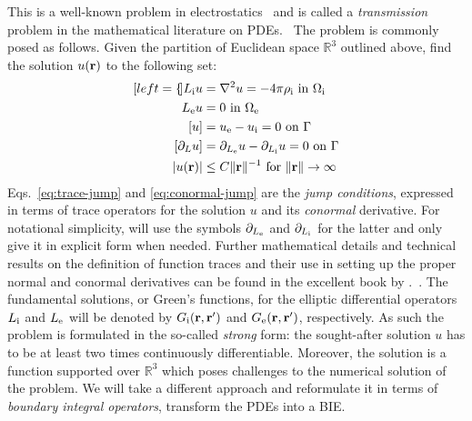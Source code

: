This is a well-known problem in electrostatics~\autocite{Jackson1999, Vanderlinde2005-gf}
and is called a \emph{transmission} problem in the mathematical
literature on \acp{PDE}.~\autocite{Hackbusch1995-uq, Sauter2011-an}
The problem is commonly posed as follows. Given the partition of Euclidean
space $\mathbb{R}^3$ outlined above, find the solution $u(\mathbf{r})$
to the following set:
\begin{subequations}\label{eq:transmission}
  \begin{align}[left={\empheqlbrace}]
  \Li u &= \nabla^2 u = -4\pi\rhoi \,\, \text{in}\,\, \Omegai \label{eq:internal} \\
  \Le u &= 0 \,\, \text{in}\,\, \Omegae \label{eq:external} \\
  [u] &= \ue - \ui = 0 \,\, \text{on}\,\, \Gamma
  \label{eq:trace-jump} \\
[\partial_L u] &= \partiale u - \partiali u = 0 \,\, \text{on}\,\, \Gamma \label{eq:conormal-jump} \\
|u(\vect{r})| &\leq C \|\vect{r} \|^{-1} \,\,\text{for}\,\,\| \vect{r} \|\rightarrow\infty
\label{eq:radiation}
\end{align}
\end{subequations}
Eqs.~\eqref{eq:trace-jump} and \eqref{eq:conormal-jump}
are the \emph{jump conditions}, expressed in terms of trace operators
for the solution $u$ and its \emph{conormal} derivative.
For notational simplicity, will use the symbols $\partial_{L_\mathrm{e}}$ and $\partial_{L_\mathrm{i}}$
for the latter and only give it in explicit form when needed.
Further mathematical details and technical results on the definition of
function traces and their use in setting up the proper normal and
conormal derivatives can be found in the excellent book by
\citeauthor{Sauter2011-an}.~\autocite{Sauter2011-an}.
The fundamental solutions, or Green's functions, for the elliptic
differential operators $L_\mathrm{i}$ and $L_\mathrm{e}$ will be denoted by $G_\mathrm{i}(\mathbf{r}, \mathbf{r}^\prime)$ and
$G_\mathrm{e}(\mathbf{r}, \mathbf{r}^\prime)$, respectively.
As such the problem is formulated in the so-called \emph{strong} form:
the sought-after solution $u$ has to be at least two times continuously
differentiable.
Moreover, the solution is a function supported over $\mathbb{R}^3$ which
poses challenges to the numerical solution of the problem.
We will take a different approach and reformulate it in terms of
\emph{boundary integral operators}, \ie transform the \acsp{PDE} into a
\ac{BIE}.

